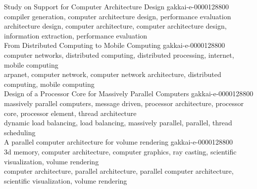 \begin{mdframed}[backgroundcolor=blue!2, font=\small]
Study on Support for Computer Architecture Design {\small gakkai-e-0000128800}\\
compiler generation, computer architecture design, performance evaluation \\
architecture design, computer architecture, computer architecture design, information extraction, performance evaluation \\

From Distributed Computing to Mobile Computing {\small gakkai-e-0000128800}\\
computer networks, distributed computing, distributed processing, internet, mobile computing \\
arpanet, computer network, computer network architecture, distributed computing, mobile computing \\

Design of a Processor Core for Massively Parallel Computers {\small gakkai-e-0000128800}\\
massively parallel computers, message driven, processor architecture, processor core, processor element, thread architecture \\
dynamic load balancing, load balancing, massively parallel, parallel, thread scheduling \\

A parallel computer architecture for volume rendering {\small gakkai-e-0000128800}\\
3d memory, computer architecture, computer graphics, ray casting, scientific visualization, volume rendering \\
computer architecture, parallel architecture, parallel computer architecture, scientific visualization, volume rendering \\
    
    \end{mdframed}
\fi